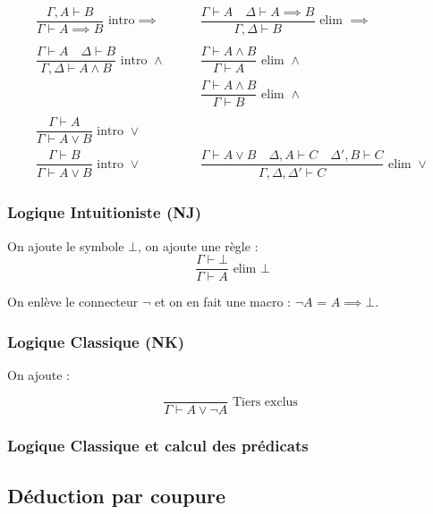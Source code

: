 \documentclass[french]{article}
\begin{document}
\begin{align*}
\dfrac{\Gamma ,A\vdash B}{\Gamma\vdash A\implies B} \text{ intro} \implies &\qquad 
\dfrac{\Gamma\vdash A \quad \Delta\vdash A\implies B}{\Gamma ,\Delta\vdash B} \text{ elim }\implies \\ 
\\
\dfrac{\Gamma\vdash A \quad \Delta \vdash B}{\Gamma, \Delta \vdash A\land B} \text{ intro } \land  &\qquad 
\dfrac{\Gamma\vdash A \land B}{\Gamma \vdash A} \text{ elim }\land \\
&\qquad \dfrac{\Gamma\vdash A \land B}{\Gamma \vdash B} \text{ elim }\land  \\
\\
\dfrac{\Gamma\vdash A}{\Gamma \vdash A \lor B} \text{ intro }\lor &\qquad \\
\dfrac{\Gamma\vdash B}{\Gamma \vdash A \lor B} \text{ intro }\lor 
&\qquad \dfrac{\Gamma\vdash A \lor B \quad \Delta,A \vdash C \quad \Delta',B \vdash C}{\Gamma, \Delta, \Delta' \vdash C} \text{ elim }\lor 
\end{align*}

\subsubsection{Logique Intuitioniste (NJ)}

On ajoute le symbole $\bot$, on ajoute une règle :
\[\dfrac{\Gamma\vdash\bot}{\Gamma\vdash A}\text{ elim }\bot\]

On enlève le connecteur $\neg$ et on en fait une macro : $\neg A$ = $A\implies\bot$.


\subsubsection{Logique Classique (NK)}

On ajoute : 

\[\dfrac{}{\Gamma\vdash A\vee\neg A}\text{ Tiers exclus }\]

\subsubsection{Logique Classique et calcul des prédicats}


\subsection{Déduction par coupure}
\end{document}

